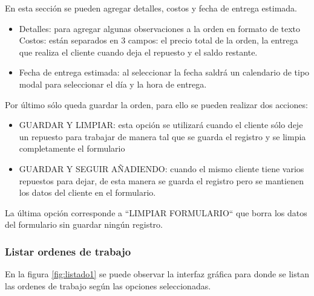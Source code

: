 En esta sección se pueden agregar detalles, costos y fecha de entrega estimada.

\begin{itemize}
\item Detalles: para agregar algunas observaciones a la orden en formato de texto
Costos: están separados en 3 campos: el precio total de la orden, la entrega que realiza el cliente cuando deja el repuesto y el saldo restante. 
\item Fecha de entrega estimada: al seleccionar la fecha saldrá un calendario de tipo modal para seleccionar el día y la hora de entrega. 
\end{itemize}


Por último sólo queda guardar la orden, para ello se pueden realizar dos acciones: 

\begin{itemize}
\item GUARDAR Y LIMPIAR: esta opción se utilizará cuando el cliente sólo deje un repuesto para trabajar de manera tal que se guarda el registro y se limpia completamente el formulario

\item GUARDAR Y SEGUIR AÑADIENDO: cuando el mismo cliente tiene varios repuestos para dejar, de esta manera se guarda el registro pero se mantienen los datos del cliente en el formulario. 
\end{itemize}

La última opción corresponde a ``LIMPIAR FORMULARIO`` que borra los datos del formulario sin guardar ningún registro.


\subsubsection{Listar ordenes de trabajo}
\label{subsubsec:frontlistarordenes}

En la figura \ref{fig:listado1} se puede observar la interfaz gráfica para donde se listan las ordenes de trabajo según las opciones seleccionadas.

